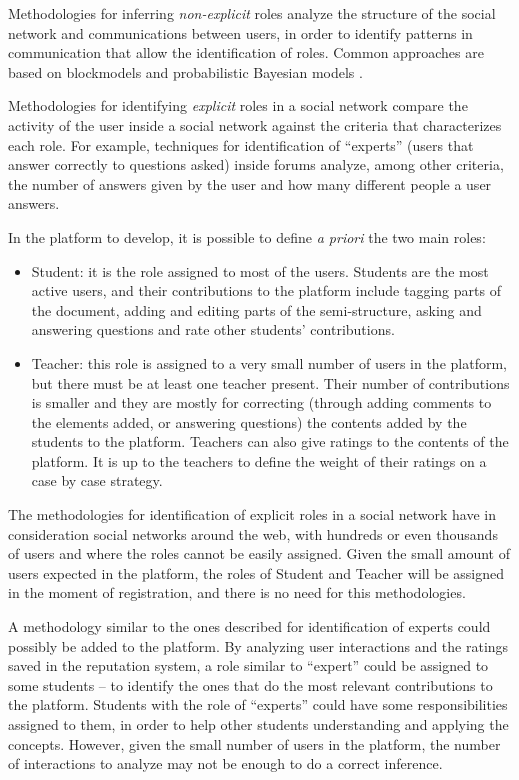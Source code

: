 Methodologies for inferring \textit{non-explicit} roles analyze the structure of the social network and communications between users, in order to identify patterns in communication that allow the identification of roles. Common approaches are based on blockmodels \cite{borgatti1993two,breiger1975algorithm} and probabilistic Bayesian models \cite{steyvers2004probabilistic,mccallum2007topic,daud2009generalized}.

Methodologies for identifying \textit{explicit} roles in a social network compare the activity of the user inside a social network against the criteria that characterizes each role. For example, techniques for identification of ``experts'' (users that answer correctly to questions asked) inside forums \cite{zhang2007expertise} analyze, among other criteria, the number of answers given by the user and how many different people a user answers.

In the platform to develop, it is possible to define \textit{a priori} the two main roles:
\begin{itemize}
\item Student: it is the role assigned to most of the users. Students are the most active users, and their contributions to the platform include tagging parts of the document, adding and editing parts of the semi-structure, asking and answering questions and rate other students' contributions.

\item Teacher: this role is assigned to a very small number of users in the platform, but there must be at least one teacher present. Their number of contributions is smaller and they are mostly for correcting (through adding comments to the elements added, or answering questions) the contents added by the students to the platform. Teachers can also give ratings to the contents of the platform. It is up to the teachers to define the weight of their ratings on a case by case strategy.
\end{itemize}

The methodologies for identification of explicit roles in a social network \cite{zhang2007expertise,agarwal2008identifying} have in consideration social networks around the web, with hundreds or even thousands of users and where the roles cannot be easily assigned. Given the small amount of users expected in the platform, the roles of Student and Teacher will be assigned in the moment of registration, and there is no need for this methodologies. 

A methodology similar to the ones described for identification of experts \cite{zhang2007expertise} could possibly be added to the platform. By analyzing user interactions and the ratings saved in the reputation system, a role similar to ``expert'' could be assigned to some students – to identify the ones that do the most relevant contributions to the platform. Students with the role of ``experts'' could have some responsibilities assigned to them, in order to help other students understanding and applying the concepts. However, given the small number of users in the platform, the number of interactions to analyze may not be enough to do a correct inference.

